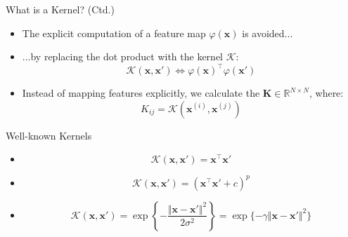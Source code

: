 \begin{frame}{What is a Kernel? (Ctd.)}{}\important
	\begin{itemize}
		\item The explicit computation of a feature map $\varphi(\bm{x})$ is avoided...
		\item ...by replacing the dot product with the kernel $\mathcal{K}$:
		\begin{equation}
			\mathcal{K}(\bm{x}, \bm{x'}) \Leftrightarrow \varphi(\bm{x})^{\intercal} \varphi(\bm{x'})
		\end{equation}
		\item Instead of mapping features explicitly, we calculate the 
			$\bm{K} \in \mathbb{R}^{N \times N}$, where: 
		\begin{equation}
			K_{ij} = \mathcal{K}(\bm{x}^{(i)}, \bm{x}^{(j)})
		\end{equation}
	\end{itemize}
\end{frame}


\begin{frame}{Well-known Kernels}{}\important
	\begin{itemize}
		\item {}
		\begin{equation}
			\mathcal{K}(\bm{x}, \bm{x'}) = \bm{x}^{\intercal} \bm{x'}
		\end{equation}
		\item {}
		\begin{equation}
			\mathcal{K}(\bm{x}, \bm{x'}) = (\bm{x}^{\intercal}\bm{x'} + c)^p
		\end{equation}
		\item {}
		\begin{equation}
			\mathcal{K}(\bm{x}, \bm{x'}) = \exp \left\{ -\frac{\Vert \bm{x} - \bm{x'} \Vert^2}{2 \sigma^2} \right\}
				= \exp \{ -\gamma \Vert \bm{x} - \bm{x'} \Vert^2 \}
		\end{equation}
	\end{itemize}
\end{frame}


